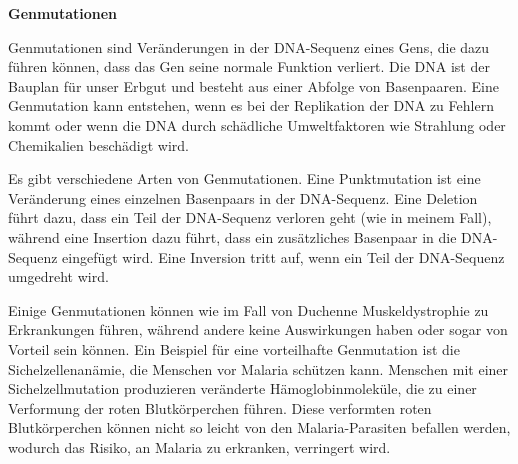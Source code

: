 \documentclass[fontsize=14pt,a4paper,headinclude,DIV=calc,automark]{scrbook}
\begin{document}
\begin{tcolorbox}[
    enhanced,
    breakable,
    colframe=rahmenlinie,      %
    colback=white,             %
    left=12pt, right=12pt,     %
    top=12pt, bottom=12pt,     %
    boxrule=0.3pt,             %
    arc=8pt                    %
]
\small\sffamily
\setlength{\parindent}{0pt} %

\textbf{Genmutationen}

\vspace{0.5\baselineskip}

Genmutationen sind Veränderungen in der DNA-Sequenz eines Gens, die dazu führen können, dass das Gen seine normale Funktion verliert. Die DNA ist der Bauplan für unser Erbgut und besteht aus einer Abfolge von Basenpaaren. Eine Genmutation kann entstehen, wenn es bei der Replikation der DNA zu Fehlern kommt oder wenn die DNA durch schädliche Umweltfaktoren wie Strahlung oder Chemikalien beschädigt wird.

\vspace{0.5\baselineskip}

Es gibt verschiedene Arten von Genmutationen. Eine Punktmutation ist eine Veränderung eines einzelnen Basenpaars in der DNA-Sequenz. Eine Deletion führt dazu, dass ein Teil der DNA-Sequenz verloren geht (wie in meinem Fall), während eine Insertion dazu führt, dass ein zusätzliches Basenpaar in die DNA-Sequenz eingefügt wird. Eine Inversion tritt auf, wenn ein Teil der DNA-Sequenz umgedreht wird.

\vspace{0.5\baselineskip}

Einige Genmutationen können wie im Fall von Duchenne Muskeldystrophie zu Erkrankungen führen, während andere keine Auswirkungen haben oder sogar von Vorteil sein können. Ein Beispiel für eine vorteilhafte Genmutation ist die Sichelzellenanämie, die Menschen vor Malaria schützen kann. Menschen mit einer Sichelzellmutation produzieren veränderte Hämoglobinmoleküle, die zu einer Verformung der roten Blutkörperchen führen. Diese verformten roten Blutkörperchen können nicht so leicht von den Malaria-Parasiten befallen werden, wodurch das Risiko, an Malaria zu erkranken, verringert wird.

\end{tcolorbox}

\vspace{0.8\baselineskip}
\end{document}

